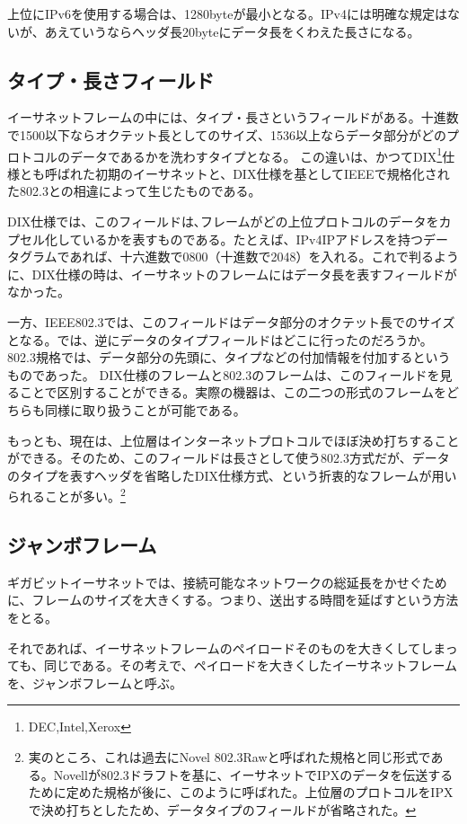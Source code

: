 上位にIPv6を使用する場合は、1280byteが最小となる。IPv4には明確な規定はないが、あえていうならヘッダ長20byteにデータ長をくわえた長さになる。

\subsection{タイプ・長さフィールド}
イーサネットフレームの中には、タイプ・長さというフィールドがある。十進数で1500以下ならオクテット長としてのサイズ、1536以上ならデータ部分がどのプロトコルのデータであるかを洗わすタイプとなる。
この違いは、かつてDIX\footnote{DEC,Intel,Xerox}仕様とも呼ばれた初期のイーサネットと、DIX仕様を基としてIEEEで規格化された802.3との相違によって生じたものである。

DIX仕様では、このフィールドは､フレームがどの上位プロトコルのデータをカプセル化しているかを表すものである。たとえば、IPv4IPアドレスを持つデータグラムであれば、十六進数で0800（十進数で2048）を入れる。これで判るように、DIX仕様の時は、イーサネットのフレームにはデータ長を表すフィールドがなかった。

一方、IEEE802.3では、このフィールドはデータ部分のオクテット長でのサイズとなる。では、逆にデータのタイプフィールドはどこに行ったのだろうか。802.3規格では、データ部分の先頭に、タイプなどの付加情報を付加するというものであった。
DIX仕様のフレームと802.3のフレームは、このフィールドを見ることで区別することができる。実際の機器は、この二つの形式のフレームをどちらも同様に取り扱うことが可能である。

もっとも、現在は、上位層はインターネットプロトコルでほぼ決め打ちすることができる。そのため、このフィールドは長さとして使う802.3方式だが、データのタイプを表すヘッダを省略したDIX仕様方式、という折衷的なフレームが用いられることが多い。\footnote{実のところ、これは過去にNovel 802.3Rawと呼ばれた規格と同じ形式である。Novellが802.3ドラフトを基に、イーサネットでIPXのデータを伝送するために定めた規格が後に、このように呼ばれた。上位層のプロトコルをIPXで決め打ちとしたため、データタイプのフィールドが省略された。}



\subsection{ジャンボフレーム}
ギガビットイーサネットでは、接続可能なネットワークの総延長をかせぐために、フレームのサイズを大きくする。つまり、送出する時間を延ばすという方法をとる。

それであれば、イーサネットフレームのペイロードそのものを大きくしてしまっても、同じである。その考えで、ペイロードを大きくしたイーサネットフレームを、ジャンボフレームと呼ぶ。

